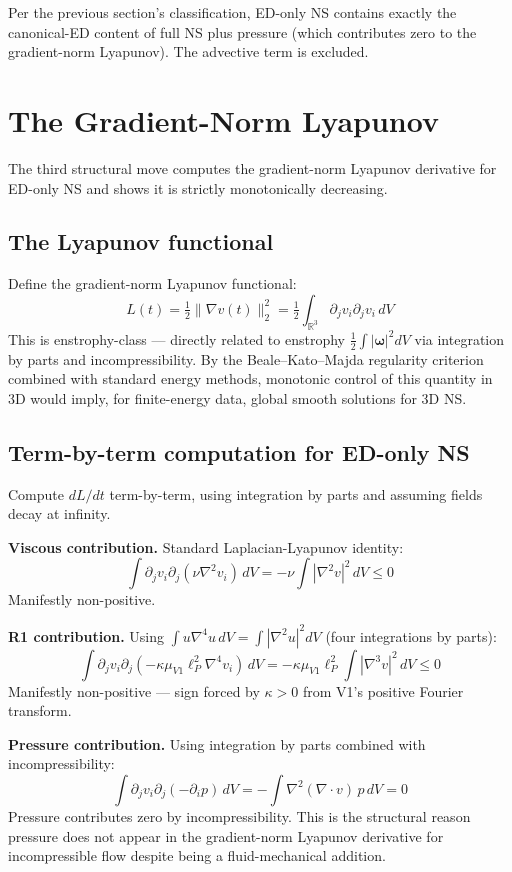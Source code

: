 \documentclass[11pt,a4paper]{article}
\begin{document}
Per the previous section's classification, ED-only NS contains exactly the canonical-ED content of full NS plus pressure (which contributes zero to the gradient-norm Lyapunov). The advective term is excluded.

\section{The Gradient-Norm Lyapunov}

The third structural move computes the gradient-norm Lyapunov derivative for ED-only NS and shows it is strictly monotonically decreasing.

\subsection{The Lyapunov functional}

Define the gradient-norm Lyapunov functional:
\[
L(t) = \tfrac{1}{2}\|\nabla v(t)\|^2_2 = \tfrac{1}{2}\int_{\mathbb{R}^3}\partial_j v_i\partial_j v_i\, dV
\]
This is enstrophy-class --- directly related to enstrophy $\tfrac{1}{2}\int|\boldsymbol{\omega}|^2 dV$ via integration by parts and incompressibility. By the Beale--Kato--Majda regularity criterion combined with standard energy methods, monotonic control of this quantity in 3D would imply, for finite-energy data, global smooth solutions for 3D NS.

\subsection{Term-by-term computation for ED-only NS}

Compute $dL/dt$ term-by-term, using integration by parts and assuming fields decay at infinity.

\textbf{Viscous contribution.} Standard Laplacian-Lyapunov identity:
\[
\int \partial_j v_i\partial_j(\nu\nabla^2 v_i)\, dV = -\nu\int|\nabla^2 v|^2\, dV \leq 0
\]
Manifestly non-positive.

\textbf{R1 contribution.} Using $\int u\nabla^4 u\, dV = \int|\nabla^2 u|^2 dV$ (four integrations by parts):
\[
\int \partial_j v_i\partial_j(-\kappa\mu_{V1}\ell_P^2\nabla^4 v_i)\, dV = -\kappa\mu_{V1}\ell_P^2\int|\nabla^3 v|^2\, dV \leq 0
\]
Manifestly non-positive --- sign forced by $\kappa > 0$ from V1's positive Fourier transform.

\textbf{Pressure contribution.} Using integration by parts combined with incompressibility:
\[
\int \partial_j v_i\partial_j(-\partial_i p)\, dV = -\int\nabla^2(\nabla\cdot v)\, p\, dV = 0
\]
Pressure contributes zero by incompressibility. This is the structural reason pressure does not appear in the gradient-norm Lyapunov derivative for incompressible flow despite being a fluid-mechanical addition.
\end{document}
